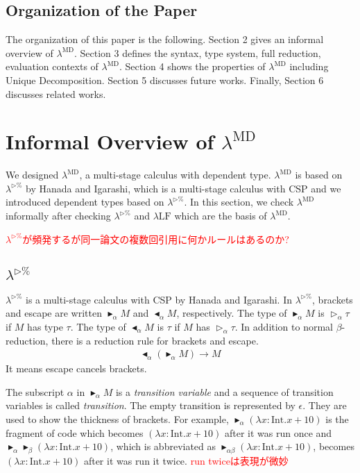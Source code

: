 \documentclass[runningheads]{llncs}
\newcommand{\red}[1]{\textcolor{red}{#1 }}
\newcommand{\LTP}{$\lambda^{\triangleright\%}$\xspace}
\newcommand{\LMD}{$\lambda^{\textrm{MD}}$\xspace}
\newcommand{\LLF}{$\lambda\textrm{LF}$\xspace}
\newcommand{\TW}{\triangleright}
\newcommand{\TB}{\blacktriangleright}
\newcommand{\TBL}{\blacktriangleleft}
\newcommand{\I}{\textrm{Int}}
\begin{document}
\subsection{Organization of the Paper}

The organization of this paper is the following.
Section 2 gives an informal overview of \LMD.
Section 3 defines the syntax, type system, full reduction, evaluation contexts of \LMD.
Section 4 shows the properties of \LMD including Unique Decomposition.
Section 5 discusses future works.
Finally, Section 6 discusses related works.

\section{Informal Overview of \LMD}

We designed \LMD, a multi-stage calculus with dependent type.
\LMD is based on \LTP\cite{Hanada2014} by Hanada and Igarashi, which is a multi-stage calculus with CSP and
we introduced dependent types based on \LTP\cite{attapl}.
In this section, we check \LMD informally after checking \LTP and \LLF which are the basis of \LMD.

\red{\LTP\cite{Hanada2014}が頻発するが同一論文の複数回引用に何かルールはあるのか?}
\subsection{\LTP}


\LTP\cite{Hanada2014} is a multi-stage calculus with CSP by Hanada and Igarashi.
In \LTP, brackets and escape are written $\TB_\alpha M$ and $\TBL_\alpha M$, respectively.
The type of $\TB_\alpha M$ is $\TW_\alpha \tau$ if $M$ has type $\tau$.
The type of $\TBL_\alpha M$ is $\tau$ if $M$ has $\TW_\alpha \tau$.
In addition to normal $\beta$-reduction, there is a reduction rule for brackets and escape.
\begin{align*}
    \TBL_\alpha (\TB_\alpha M) \longrightarrow M 
\end{align*}
It means escape cancels brackets.


The subscript $\alpha$ in $\TB_\alpha M$ is a \textit{transition variable} and
a sequence of transition variables is called \textit{transition}.
The empty transition is represented by $\epsilon$.
They are used to show the thickness of brackets.
For example, $\TB_\alpha (\lambda x:\I.x+10)$ is the fragment of code which becomes $(\lambda x:\I.x+10)$ after it was run once and
$\TB_\alpha \TB_\beta (\lambda x:\I.x+10)$, which is abbreviated as $\TB_{\alpha\beta} (\lambda x:\I.x+10)$,
becomes $(\lambda x:\I.x+10)$ after it was run it twice.
\red{run twiceは表現が微妙}
\end{document}
